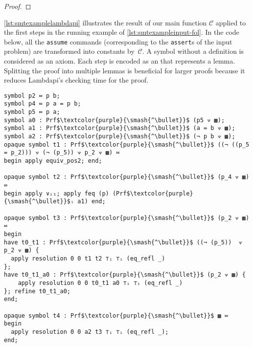 \begin{theorem}[Resolution]
\begin{proof}
\end{proof}
\end{theorem}


\begin{example}
  \cref{lst:smtexamplelambdapi} illustrates the result of our main function $\mathcal{C}$ applied to the first steps in the running example of \cref{lst:smtexampleinput-fol}.
  In the code below, all the \texttt{assume} commands (corresponding to the \texttt{assert}s of the input problem) are transformed into constants by~$\mathcal{C}$. A symbol without a definition is considered as an axiom.
  Each step is encoded as an  that represents a lemma. Splitting the proof into multiple lemmas is beneficial for larger proofs because it reduces Lambdapi's checking time for the proof.
\end{example}

\begin{lstlisting}[mathescape=true, caption={Trace from \cref{lst:smtexampleinput} encoded in Lambdapi.}, label={lst:smtexamplelambdapi}, language=Lambdapi]
symbol p2 ≔ p b;
symbol p4 ≔ p a = p b;
symbol p5 ≔ p a;
symbol a0 : Prf$\textcolor{purple}{\smash{^\bullet}}$ (p5 ⟇ ▩);
symbol a1 : Prf$\textcolor{purple}{\smash{^\bullet}}$ (a = b ⟇ ▩);
symbol a2 : Prf$\textcolor{purple}{\smash{^\bullet}}$ (¬ p b ⟇ ▩);
opaque symbol t1 : Prf$\textcolor{purple}{\smash{^\bullet}}$ ((¬ ((p_5 = p_2))) ⟇ (¬ (p_5)) ⟇ p_2 ⟇ ▩) ≔
begin apply equiv_pos2; end;

opaque symbol t2 : Prf$\textcolor{purple}{\smash{^\bullet}}$ (p_4 ⟇ ▩) ≔
begin apply ∨ᵢ₁; apply feq (p) (Prf$\textcolor{purple}{\smash{^\bullet}}$ₗ a1) end;

opaque symbol t3 : Prf$\textcolor{purple}{\smash{^\bullet}}$ (p_2 ⟇ ▩) ≔
begin
have t0_t1 : Prf$\textcolor{purple}{\smash{^\bullet}}$ ((¬ (p_5))  ⟇ p_2 ⟇ ▩) {
  apply resolution 0 0 t1 t2 ⊤ᵢ ⊤ᵢ (eq_refl _)
};
have t0_t1_a0 : Prf$\textcolor{purple}{\smash{^\bullet}}$ (p_2 ⟇ ▩) {
    apply resolution 0 0 t0_t1 a0 ⊤ᵢ ⊤ᵢ (eq_refl _)
}; refine t0_t1_a0;
end;

opaque symbol t4 : Prf$\textcolor{purple}{\smash{^\bullet}}$ ▩ ≔
begin
  apply resolution 0 0 a2 t3 ⊤ᵢ ⊤ᵢ (eq_refl _);
end;
\end{lstlisting}

